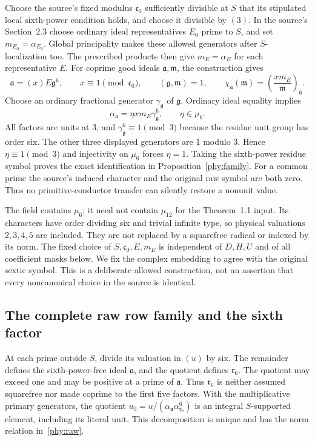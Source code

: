 \documentclass[11pt]{article}
\theoremstyle{definition}\newtheorem{definition}[theorem]{Definition}
\theoremstyle{remark}\newtheorem{remark}[theorem]{Remark}
\begin{document}
Choose the source's fixed modulus $\mathfrak c_0$ sufficiently divisible
at $S$ that its stipulated local sixth-power condition holds, and choose
it divisible by $(3)$. In the source's Section~2.3 choose ordinary ideal
representatives $E_0$ prime to $S$, and set
$m_{E_0}=\alpha_{E_0}$. Global principality makes these allowed
generators after $S$-localization too. The prescribed products then give
$m_E=\alpha_E$ for each representative $E$.
For coprime good ideals $\mathfrak a,\mathfrak m$, the construction gives
\[
 \mathfrak a=(x)E\mathfrak g^6,\qquad
 x\equiv1\pmod{\mathfrak c_0},\qquad
 (\mathfrak g,\mathfrak m)=1,
 \qquad
 \chi_{\mathfrak a}(\mathfrak m)
       =\left(\frac{xm_E}{\mathfrak m}\right)_6.
\]
Choose an ordinary fractional generator $\gamma_{\mathfrak g}$ of
$\mathfrak g$. Ordinary ideal equality implies
\begin{equation}\label{phy:generator-proof}
 \alpha_{\mathfrak a}=\eta x m_E\gamma_{\mathfrak g}^6,
          \qquad\eta\in\mu_6.
\end{equation}
All factors are units at $3$, and
$\gamma_{\mathfrak g}^6\equiv1\pmod3$ because the residue unit
group has order six. The other three displayed generators are $1$
modulo $3$. Hence $\eta\equiv1\pmod3$ and injectivity on $\mu_6$
forces $\eta=1$. Taking the sixth-power residue symbol proves the exact
identification in Proposition~\ref{phy:family}. For a common prime the
source's induced character and the original raw symbol are both zero.
Thus no primitive-conductor transfer can silently restore a nonunit value.

The field contains $\mu_6$; it need not contain $\mu_{12}$ for the
Theorem~1.1 input. Its characters have order dividing six and trivial
infinite type, so physical valuations $2,3,4,5$ are included. They are
not replaced by a squarefree radical or indexed by its norm. The fixed
choice of $S,\mathfrak c_0,E,m_E$ is independent of $D,H,U$ and of all
coefficient masks below. We fix the complex embedding to agree with the
original sextic symbol. This is a deliberate allowed construction, not
an assertion that every noncanonical choice in the source is identical.

\subsection{The complete raw row family and the sixth factor}\label{phy:raw-proof}
At each prime outside $S$, divide its valuation in $(u)$ by six.
The remainder defines the sixth-power-free ideal $\mathfrak a$, and the
quotient defines $\mathfrak r_6$. The quotient may exceed one and may
be positive at a prime of $\mathfrak a$. Thus $\mathfrak r_6$ is neither
assumed squarefree nor made coprime to the first five factors.
With the multiplicative primary generators, the quotient
$u_0=u/(\alpha_{\mathfrak a}\alpha_{\mathfrak r_6}^6)$
is an integral $S$-supported element, including its literal unit.
This decomposition is unique and has the norm relation in~\eqref{phy:raw}.
\end{document}
